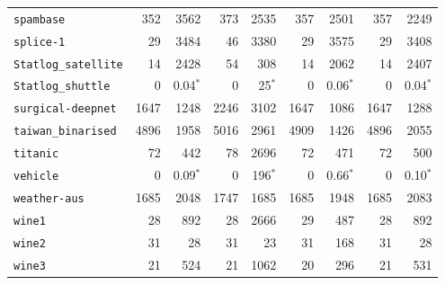 \begin{tabular}{lrrrrrrrr}
\texttt{spambase} & 352 & 3562 & 373 & 2535 & 357 & 2501 & 357 & 2249\\
\texttt{splice-1} & 29 & 3484 & 46 & 3380 & 29 & 3575 & 29 & 3408\\
\texttt{Statlog\_satellite} & 14 & 2428 & 54 & 308 & 14 & 2062 & 14 & 2407\\
\texttt{Statlog\_shuttle} & 0 & 0.04$^*$ & 0 & 25$^*$ & 0 & 0.06$^*$ & 0 & 0.04$^*$\\
\texttt{surgical-deepnet} & 1647 & 1248 & 2246 & 3102 & 1647 & 1086 & 1647 & 1288\\
\texttt{taiwan\_binarised} & 4896 & 1958 & 5016 & 2961 & 4909 & 1426 & 4896 & 2055\\
\texttt{titanic} & 72 & 442 & 78 & 2696 & 72 & 471 & 72 & 500\\
\texttt{vehicle} & 0 & 0.09$^*$ & 0 & 196$^*$ & 0 & 0.66$^*$ & 0 & 0.10$^*$\\
\texttt{weather-aus} & 1685 & 2048 & 1747 & 1685 & 1685 & 1948 & 1685 & 2083\\
\texttt{wine1} & 28 & 892 & 28 & 2666 & 29 & 487 & 28 & 892\\
\texttt{wine2} & 31 & 28 & 31 & 23 & 31 & 168 & 31 & 28\\
\texttt{wine3} & 21 & 524 & 21 & 1062 & 20 & 296 & 21 & 531\\
\bottomrule
\end{tabular}
